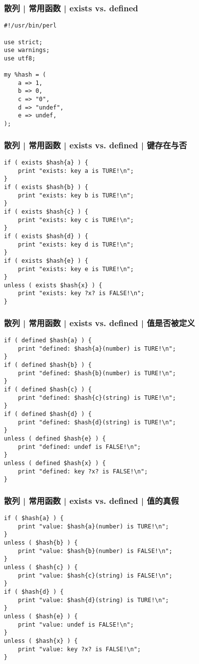 \begin{frame}[fragile]
  \frametitle{散列 | \alert{常用函数} | exists vs. defined}
\begin{lstlisting}
#!/usr/bin/perl 

use strict;
use warnings;
use utf8;

my %hash = (
    a => 1,
    b => 0,
    c => "0",
    d => "undef",
    e => undef,
);
\end{lstlisting}
\end{frame}

\begin{frame}[fragile]
  \frametitle{散列 | \alert{常用函数} | exists vs. defined | 键存在与否}
  \vspace{-0.5em}
\begin{lstlisting}[basicstyle=\small\tt]
if ( exists $hash{a} ) {
    print "exists: key a is TURE!\n";
}
if ( exists $hash{b} ) {
    print "exists: key b is TURE!\n";
}
if ( exists $hash{c} ) {
    print "exists: key c is TURE!\n";
}
if ( exists $hash{d} ) {
    print "exists: key d is TURE!\n";
}
if ( exists $hash{e} ) {
    print "exists: key e is TURE!\n";
}
unless ( exists $hash{x} ) {
    print "exists: key ?x? is FALSE!\n";
}
\end{lstlisting}
\end{frame}

\begin{frame}[fragile]
  \frametitle{散列 | \alert{常用函数} | exists vs. defined | 值是否被定义}
  \vspace{-0.5em}
\begin{lstlisting}[basicstyle=\small\tt]
if ( defined $hash{a} ) {
    print "defined: $hash{a}(number) is TURE!\n";
}
if ( defined $hash{b} ) {
    print "defined: $hash{b}(number) is TURE!\n";
}
if ( defined $hash{c} ) {
    print "defined: $hash{c}(string) is TURE!\n";
}
if ( defined $hash{d} ) {
    print "defined: $hash{d}(string) is TURE!\n";
}
unless ( defined $hash{e} ) {
    print "defined: undef is FALSE!\n";
}
unless ( defined $hash{x} ) {
    print "defined: key ?x? is FALSE!\n";
}
\end{lstlisting}
\end{frame}

\begin{frame}[fragile]
  \frametitle{散列 | \alert{常用函数} | exists vs. defined | 值的真假}
  \vspace{-0.5em}
\begin{lstlisting}[basicstyle=\small\tt]
if ( $hash{a} ) {
    print "value: $hash{a}(number) is TURE!\n";
}
unless ( $hash{b} ) {
    print "value: $hash{b}(number) is FALSE!\n";
}
unless ( $hash{c} ) {
    print "value: $hash{c}(string) is FALSE!\n";
}
if ( $hash{d} ) {
    print "value: $hash{d}(string) is TURE!\n";
}
unless ( $hash{e} ) {
    print "value: undef is FALSE!\n";
}
unless ( $hash{x} ) {
    print "value: key ?x? is FALSE!\n";
}
\end{lstlisting}
\end{frame}


